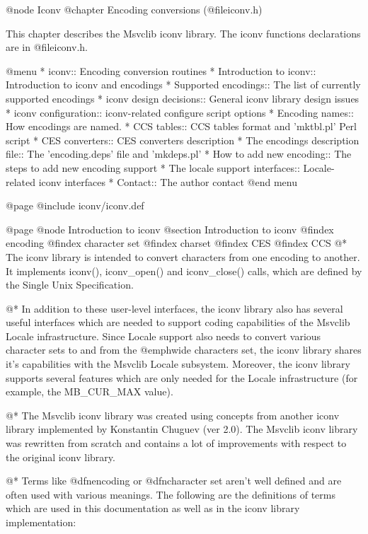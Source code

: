 @node Iconv
@chapter Encoding conversions (@file{iconv.h})

This chapter describes the Msvclib iconv library.
The iconv functions declarations are in
@file{iconv.h}.

@menu
* iconv::                           Encoding conversion routines
* Introduction to iconv::           Introduction to iconv and encodings
* Supported encodings::             The list of currently supported encodings
* iconv design decisions::          General iconv library design issues
* iconv configuration::             iconv-related configure script options
* Encoding names::                  How encodings are named.
* CCS tables::                      CCS tables format and 'mktbl.pl' Perl script
* CES converters::                  CES converters description
* The encodings description file::  The 'encoding.deps' file and 'mkdeps.pl'
* How to add new encoding::         The steps to add new encoding support
* The locale support interfaces::   Locale-related iconv interfaces
* Contact::                         The author contact
@end menu

@page
@include iconv/iconv.def

@page
@node Introduction to iconv
@section Introduction to iconv
@findex encoding
@findex character set
@findex charset
@findex CES
@findex CCS
@*
The iconv library is intended to convert characters from one encoding to
another. It implements iconv(), iconv_open() and iconv_close()
calls, which are defined by the Single Unix Specification.

@*
In addition to these user-level interfaces, the iconv library also has
several useful interfaces which are needed to support coding
capabilities of the Msvclib Locale infrastructure.  Since Locale 
support also needs to
convert various character sets to and from the @emph{wide characters
set}, the iconv library shares it's capabilities with the Msvclib Locale
subsystem. Moreover, the iconv library supports several features which are
only needed for the Locale infrastructure (for example, the MB_CUR_MAX value).

@*
The Msvclib iconv library was created using concepts from another iconv
library implemented by Konstantin Chuguev (ver 2.0). The Msvclib iconv library
was rewritten from scratch and contains a lot of improvements with respect to
the original iconv library. 

@*
Terms like @dfn{encoding} or @dfn{character set} aren't well defined and
are often used with various meanings. The following are the definitions of terms
which are used in this documentation as well as in the iconv library
implementation:

